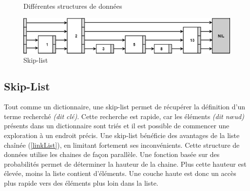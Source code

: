 \documentclass[hidelinks,a4paper, 12pt]{article}
\begin{document}
	\begin{figure}[h]
		\centering
		\caption{Différentes structures de données}
	\end{figure}
	\begin{figure}
		\includegraphics[width=\textwidth]{img/skip}
		\caption{Skip-list}
		\label{skip}
	\end{figure}
	
	\newpage
	\subsection{Skip-List}
	Tout comme un dictionnaire, une skip-list permet de récupérer la définition d'un terme recherché \textit{(dit clé)}. Cette recherche est rapide, car les éléments \textit{(dit nœud)} présents dans un dictionnaire sont triés et il est possible de commencer une exploration à un endroit précis.
	Une skip-list bénéficie des avantages de la liste chaînée (\cref{linkList}), en limitant fortement ses inconvénients. Cette structure de données utilise les chaines de façon parallèle. Une fonction basée sur des probabilités permet de déterminer la hauteur de la chaine. Plus cette hauteur est élevée, moins la liste contient d'éléments. Une couche haute est donc un accès plus rapide vers des éléments plus loin dans la liste.
	
\end{document}
